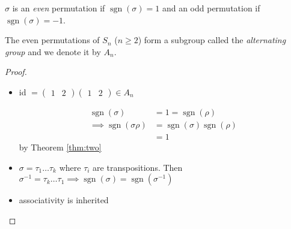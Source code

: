 \begin{definition}
\protect\hypertarget{def:eleven}{}\label{def:eleven}
$\sigma$ is an \emph{even} permutation if $\operatorname{sgn}(\sigma) = 1$ and an odd permutation if $\operatorname{sgn}(\sigma) = -1$.
\end{definition}

\begin{corollary}
The even permutations of $S_n$ ($n \geq 2$) form a subgroup called the \emph{alternating group} and we denote it by $A_n$.
\end{corollary}

\begin{proof} ~

\begin{itemize}
  \item id $= \begin{pmatrix}1 & 2\end{pmatrix} \begin{pmatrix}1 & 2\end{pmatrix} \in A_n$

  \mathitem
    \begin{align*}
      \operatorname{sgn}(\sigma) &= 1 = \operatorname{sgn}(\rho) \\ 
      \implies \operatorname{sgn}(\sigma \rho) &= \operatorname{sgn}(\sigma) \operatorname{sgn}(\rho) \\
      &= 1
    \end{align*} by Theorem \ref{thm:two}
  \item
    $\sigma = \tau_1 \dots \tau_k$ where $\tau_i$ are transpositions.
    Then $\sigma^{-1} = \tau_k \dots \tau_1 \implies \operatorname{sgn}(\sigma) = \operatorname{sgn}(\sigma^{-1})$
  \item
    associativity is inherited
\end{itemize}

\end{proof}

